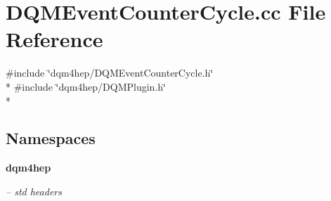 \section{D\+Q\+M\+Event\+Counter\+Cycle.\+cc File Reference}
\label{DQMEventCounterCycle_8cc}
{\ttfamily \#include \char`\"{}dqm4hep/\+D\+Q\+M\+Event\+Counter\+Cycle.\+h\char`\"{}}\\*
{\ttfamily \#include \char`\"{}dqm4hep/\+D\+Q\+M\+Plugin.\+h\char`\"{}}\\*
\subsection*{Namespaces}
\begin{DoxyCompactItemize}
\item 
 {\bf dqm4hep}
\begin{DoxyCompactList}\small\item\em -- std headers \end{DoxyCompactList}\end{DoxyCompactItemize}
